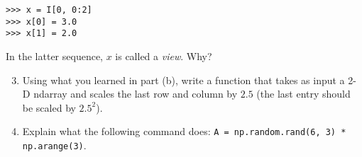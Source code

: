 \documentclass{article}
\newcounter{points}
\newcommand\printpoints{Total number of points: \thepoints}
\begin{document}
\begin{enumerate}
\begin{enumerate}
\begin{verbatim}
>>> x = I[0, 0:2]
>>> x[0] = 3.0
>>> x[1] = 2.0
\end{verbatim}

In the latter sequence, $x$ is called a \emph{view}.  Why?
\end{enumerate}

\begin{enumerate}
\setcounter{enumii}{2}
\item Using what you learned in part (b), write a function that takes as input a 2-D ndarray and scales the last row and column by $2.5$ (the last entry should be scaled by $2.5^2$).
\end{enumerate}


\begin{enumerate}
\setcounter{enumii}{3}
\item Explain what the following command does: \texttt{A = np.random.rand(6, 3) * np.arange(3)}.
\end{enumerate}




%

\end{enumerate}
\end{document}
